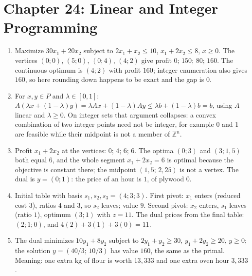 
\section*{Chapter 24: Linear and Integer Programming}
\begin{enumerate}[label=\textbf{24.\arabic*}]
  \item Maximize $30x_{1}+20x_{2}$ subject to $2x_{1}+x_{2}\le10$, $x_{1}+2x_{2}\le8$,
        $x\ge0$. The vertices $(0;0)$, $(5;0)$, $(0;4)$, $(4;2)$ give profit
        $0;\,150;\,80;\,160$. The continuous optimum is $(4;2)$ with profit $160$; integer
        enumeration also gives $160$, so here rounding down happens to be exact and
        the gap is $0$.

  \item For $x,y\in P$ and $\lambda\in[0,1]$:
        $A(\lambda x+(1-\lambda)y)=\lambda Ax+(1-\lambda)Ay\le\lambda b+(1-\lambda)b=b$,
        using $A$ linear and $\lambda\ge0$. On integer sets that argument collapses:
        a convex combination of two integer points need not be integer, for example $0$
        and $1$ are feasible while their midpoint is not a member of $\mathbb{Z}^{n}$.

  \item Profit $x_{1}+2x_{2}$ at the vertices: $0$; $4$; $6$; $6$. The optima $(0;3)$ and
        $(3;1{,}5)$ both equal $6$, and the whole segment $x_{1}+2x_{2}=6$ is optimal because
        the objective is constant there; the midpoint $(1{,}5;\,2{,}25)$ is not a vertex.
        The dual is $y=(0;1)$: the price of an hour is $1$, of plywood $0$.

  \item Initial table with basis $s_{1},s_{2},s_{3}=(4;3;3)$. First pivot: $x_{1}$ enters
        (reduced cost $3$), ratios $4$ and $3$, so $s_{2}$ leaves; value $9$.
        Second pivot: $x_{2}$ enters, $s_{1}$ leaves (ratio $1$), optimum $(3;1)$
        with $z=11$. The dual prices from the final table: $(2;1;0)$, and
        $4(2)+3(1)+3(0)=11$.

  \item The dual minimizes $10y_{1}+8y_{2}$ subject to $2y_{1}+y_{2}\ge30$,
        $y_{1}+2y_{2}\ge20$, $y\ge0$; the solution $y=(40/3;\,10/3)$ has value
        $160$, the same as the primal. Meaning: one extra kg of flour is worth
        $13{,}333$ and one extra oven hour $3{,}333$.


\end{enumerate}

